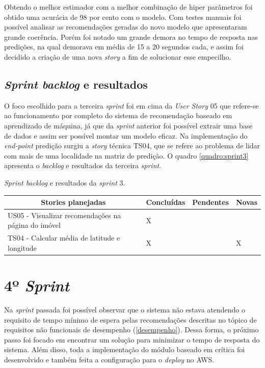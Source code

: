 Obtendo o melhor estimador com a melhor combinação de hiper parâmetros foi obtido uma acurácia de 98 por cento com o modelo. Com testes manuais foi possível analisar as recomendações geradas do novo modelo que apresentaram grande coerência. Porém foi notado um grande demora no tempo de resposta nas predições, na qual demorava em média de 15 a 20 segundos cada, e assim foi decidido a criação de uma nova \textit{story} a fim de solucionar esse empecilho.

\subsection{\textit{Sprint backlog} e resultados}

O foco escolhido para a terceira \textit{sprint} foi em cima da \textit{User Story} 05 que refere-se ao funcionamento por completo do sistema de recomendação baseado em aprendizado de máquina, já que da \textit{sprint} anterior foi possível extrair uma base de dados e assim ser possível montar um modelo eficaz. Na implementação do  \textit{end-point} predição surgiu a \textit{story} técnica TS04, que se refere ao problema de lidar com mais de uma localidade na matriz de predição. O quadro \ref{quadro:sprint3} apresenta o \textit{backlog} e resultados da terceira  \textit{sprint}.

\begin{quadro}[H]
\centering
\caption[\textit{Sprint backlog} e resultados da \textit{sprint} 3]{\textit{Sprint backlog} e resultados da \textit{sprint} 3.}
\label{quadro:sprint3}
\begin{tabular}{|p{6cm}|p{2cm}|p{2cm}|p{1cm}|}
\hline
\multicolumn{1}{|c|}{\textbf{Stories planejadas}} & \multicolumn{1}{c|}{\textbf{Concluídas}} & \multicolumn{1}{c|}{\textbf{Pendentes}} & \multicolumn{1}{c|}{\textbf{Novas}} \\ \hline
US05 - Visualizar recomendações na página do imóvel & X &  & \\ \hline
TS04 - Calcular média de latitude e longitude & X &  & X \\ \hline
\end{tabular}
\end{quadro}


\section{4º \textit{Sprint}}

Na \textit{sprint} passada foi possível observar que o sistema não estava atendendo o requisito de tempo mínimo de espera pelas recomendações descritas no tópico de requisitos não funcionais de desempenho (\ref{desempenho}). Dessa forma, o próximo passo foi focado em encontrar um solução para minimizar o tempo de resposta do sistema. Além disso, toda a implementação do módulo baseado em crítica foi desenvolvido e também feita a configuração para o \textit{deploy} no AWS.

